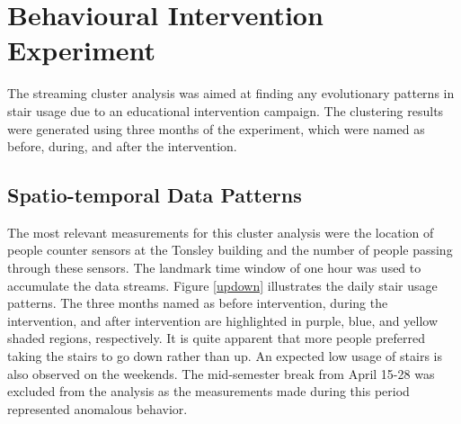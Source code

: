



 
\section{Behavioural Intervention Experiment} 

The streaming cluster analysis was aimed at finding any evolutionary patterns in stair usage due to an educational intervention campaign. The clustering results were generated using three months of the experiment, which were named as before, during, and after the intervention.


\subsection{Spatio-temporal Data Patterns}


The most relevant measurements for this cluster analysis were the location of people counter sensors at the Tonsley building and the number of people passing through these sensors. The landmark time window of one hour was used to accumulate the data streams. Figure \ref{updown} illustrates the daily stair usage patterns. The three months named as before intervention, during the intervention, and after intervention are highlighted in purple, blue, and yellow shaded regions, respectively. It is quite apparent that more people preferred taking the stairs to go down rather than up. An expected low usage of stairs is also observed on the weekends. The mid-semester break from April 15-28 was excluded from the analysis as the measurements made during this period represented anomalous behavior. 

